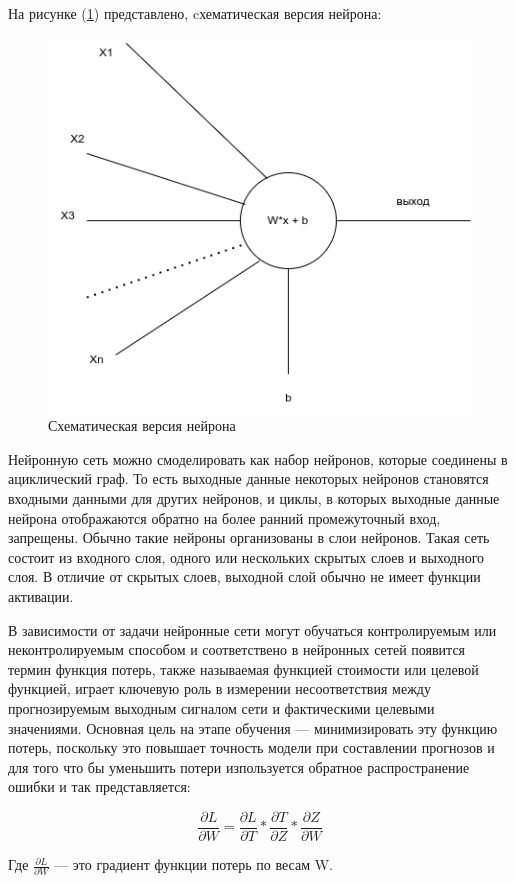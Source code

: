 На рисунке (\ref{fig:neuron}) представлено, cхематическая версия нейрона: 
\begin{figure}[H]
	\centering
	\includegraphics[width=0.5\linewidth]{images/neuron.png}
	\caption{Схематическая версия нейрона}
	\label{fig:neuron}
\end{figure}

Нейронную сеть можно смоделировать как набор нейронов, которые соединены в ациклический граф. То есть выходные данные некоторых нейронов становятся входными данными для других нейронов, и циклы, в которых выходные данные нейрона отображаются обратно на более ранний промежуточный вход, запрещены. Обычно такие нейроны организованы в слои нейронов. Такая сеть состоит из входного слоя, одного или нескольких скрытых слоев и выходного слоя. В отличие от скрытых слоев, выходной слой обычно не имеет функции активации.

В зависимости от задачи нейронные сети могут обучаться контролируемым или неконтролируемым способом и соответствено в нейронных сетей появится термин функция потерь, также называемая функцией стоимости или целевой функцией, играет ключевую роль в измерении несоответствия между прогнозируемым выходным сигналом сети и фактическими целевыми значениями. Основная цель на этапе обучения — минимизировать эту функцию потерь, поскольку это повышает точность модели при составлении прогнозов и для того что бы уменьшить потери изпользуется обратное распространение ошибки и так представляется:

\[
    \frac{\partial L}{\partial W} = \frac{\partial L}{\partial T} * \frac{\partial T}{\partial Z} * \frac{\partial Z}{\partial W}
\]

Где \(\frac{\partial L}{\partial W}\) — это градиент функции потерь по весам W.

